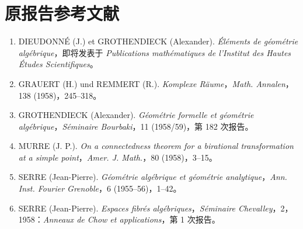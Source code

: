 \section*{原报告参考文献}
\begin{enumerate}
\item[1.]\label{fga3.i-bib-1} DIEUDONNÉ (J.) et GROTHENDIECK (Alexander). \emph{Éléments de géométrie algébrique}，即将发表于 \emph{Publications mathématiques de l'Institut des Hautes Études Scientifiques}。
\item[2.]\label{fga3.i-bib-2} GRAUERT (H.) und REMMERT (R.). \emph{Komplexe Räume}，\emph{Math. Annalen}，138 (1958)，245--318。
\item[3.]\label{fga3.i-bib-3} GROTHENDIECK (Alexander). \emph{Géométrie formelle et géométrie algébrique}，\emph{Séminaire Bourbaki}，11 (1958/59)，第 182 次报告。
\item[4.]\label{fga3.i-bib-4} MURRE (J. P.). \emph{On a connectedness theorem for a birational transformation at a simple point}，\emph{Amer. J. Math.}，80 (1958)，3--15。
\item[5.]\label{fga3.i-bib-5} SERRE (Jean-Pierre). \emph{Géométrie algébrique et géométrie analytique}，\emph{Ann. Inst. Fourier Grenoble}，6 (1955--56)，1--42。
\item[6.]\label{fga3.i-bib-6} SERRE (Jean-Pierre). \emph{Espaces fibrés algébriques}，\emph{Séminaire Chevalley}，2，1958：\emph{Anneaux de Chow et applications}，第 1 次报告。
\end{enumerate}
